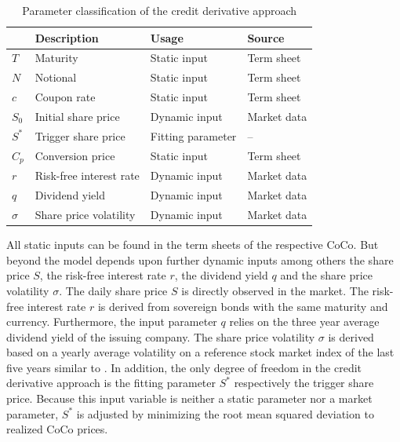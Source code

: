 \begin{table}[H]
	\setlength{\extrarowheight}{2.5pt}
	\centering
	\begin{tabular}{llll}
		\toprule
			 & \textbf{Description} & \textbf{Usage} & \textbf{Source} \\
		\midrule
			$T$ & Maturity & Static input & Term sheet \\
			$N$ & Notional & Static input & Term sheet \\			
			$c$ & Coupon rate & Static input & Term sheet \\
			$S_0$ & Initial share price & Dynamic input & Market data \\
			$S^*$ & Trigger share price & Fitting parameter & -- \\
			$C_p$ & Conversion price & Static input & Term sheet \\
			$r$ & Risk-free interest rate & Dynamic input & Market data \\
			$q$ & Dividend yield & Dynamic input & Market data\\
			$\sigma$& Share price volatility & Dynamic input & Market data \\
		\bottomrule
	\end{tabular}
	\caption[Parameter classification of the credit derivative approach]{Parameter classification of the credit derivative approach \citep{wilkens2014contingent}}
	\label{creditparameters}
\end{table}

All static inputs can be found in the term sheets of the respective CoCo. But beyond the model depends upon further dynamic inputs among others the share price $S$, the risk-free interest rate $r$, the dividend yield $q$ and the share price volatility $\sigma$. The daily share price $S$ is directly observed in the market. The risk-free interest rate $r$ is derived from sovereign bonds with the same maturity and currency. Furthermore, the input parameter $q$ relies on the three year average dividend yield of the issuing company. The share price volatility $\sigma$ is derived based on a yearly average volatility on a reference stock market index of the last five years similar to \citet{alvemar2012modelling}. In addition, the only degree of freedom in the credit derivative approach is the fitting parameter $S^*$ respectively the trigger share price. Because this input variable is neither a static parameter nor a market parameter, $S^*$ is adjusted by minimizing the root mean squared deviation to realized CoCo prices. \citep{erismann2011analytical}


